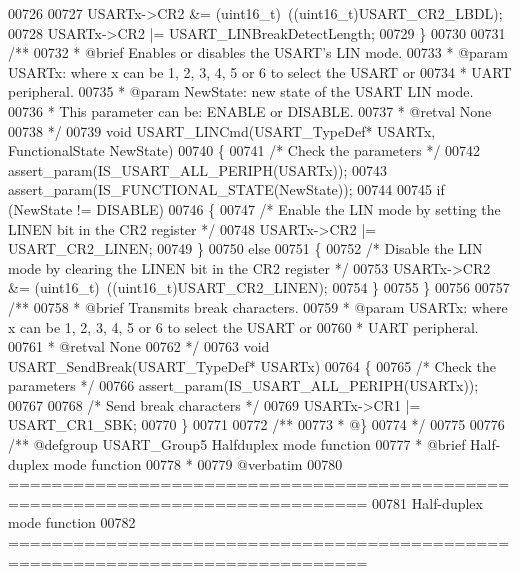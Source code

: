 \begin{DoxyCode}
00726 
00727   USARTx->CR2 &= (uint16\_t)~((uint16\_t)USART_CR2_LBDL);
00728   USARTx->CR2 |= USART\_LINBreakDetectLength;
00729 \}
00730 
00731 \textcolor{comment}{/**}
00732 \textcolor{comment}{  * @brief  Enables or disables the USART's LIN mode.}
00733 \textcolor{comment}{  * @param  USARTx: where x can be 1, 2, 3, 4, 5 or 6 to select the USART or }
00734 \textcolor{comment}{  *         UART peripheral.}
00735 \textcolor{comment}{  * @param  NewState: new state of the USART LIN mode.}
00736 \textcolor{comment}{  *          This parameter can be: ENABLE or DISABLE.}
00737 \textcolor{comment}{  * @retval None}
00738 \textcolor{comment}{  */}
00739 \textcolor{keywordtype}{void} USART_LINCmd(USART\_TypeDef* USARTx, FunctionalState NewState)
00740 \{
00741   \textcolor{comment}{/* Check the parameters */}
00742   assert_param(IS\_USART\_ALL\_PERIPH(USARTx));
00743   assert_param(IS\_FUNCTIONAL\_STATE(NewState));
00744 
00745   \textcolor{keywordflow}{if} (NewState != DISABLE)
00746   \{
00747     \textcolor{comment}{/* Enable the LIN mode by setting the LINEN bit in the CR2 register */}
00748     USARTx->CR2 |= USART_CR2_LINEN;
00749   \}
00750   \textcolor{keywordflow}{else}
00751   \{
00752     \textcolor{comment}{/* Disable the LIN mode by clearing the LINEN bit in the CR2 register */}
00753     USARTx->CR2 &= (uint16\_t)~((uint16\_t)USART_CR2_LINEN);
00754   \}
00755 \}
00756 
00757 \textcolor{comment}{/**}
00758 \textcolor{comment}{  * @brief  Transmits break characters.}
00759 \textcolor{comment}{  * @param  USARTx: where x can be 1, 2, 3, 4, 5 or 6 to select the USART or }
00760 \textcolor{comment}{  *         UART peripheral.}
00761 \textcolor{comment}{  * @retval None}
00762 \textcolor{comment}{  */}
00763 \textcolor{keywordtype}{void} USART_SendBreak(USART\_TypeDef* USARTx)
00764 \{
00765   \textcolor{comment}{/* Check the parameters */}
00766   assert_param(IS\_USART\_ALL\_PERIPH(USARTx));
00767 
00768   \textcolor{comment}{/* Send break characters */}
00769   USARTx->CR1 |= USART_CR1_SBK;
00770 \}
00771 
00772 \textcolor{comment}{/**}
00773 \textcolor{comment}{  * @\}}
00774 \textcolor{comment}{  */}
00775 
00776 \textcolor{comment}{/** @defgroup USART\_Group5 Halfduplex mode function}
00777 \textcolor{comment}{ *  @brief   Half-duplex mode function }
00778 \textcolor{comment}{ *}
00779 \textcolor{comment}{@verbatim   }
00780 \textcolor{comment}{ ===============================================================================}
00781 \textcolor{comment}{                         Half-duplex mode function}
00782 \textcolor{comment}{ ===============================================================================  }

\end{DoxyCode}
